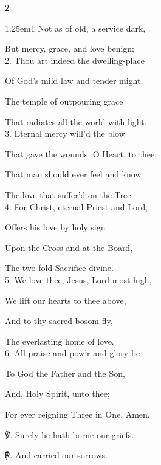 \begin{paracol}{2}
\begin{hangparas}{1.25em}{1}
Not as of old, a service dark,

But mercy, grace, and love benign;\\

2. Thou art indeed the dwelling-place

Of God's mild law and tender might,

The temple of outpouring grace

That radiates all the world with light.\\

3. Eternal mercy will'd the blow

That gave the wounds, O Heart, to thee;

That man should ever feel and know

The love that suffer'd on the Tree.\\

4. For Christ, eternal Priest and Lord,

Offers his love by holy sign

Upon the Cross and at the Board,

The two-fold Sacrifice divine.\\

5. We love thee, Jesus, Lord most high,

We lift our hearts to thee above,

And to thy sacred bosom fly,

The everlasting home of love.\\

6. All praise and pow'r and glory be

To God the Father and the Son,

And, Holy Spirit, unto thee;

For ever reigning Three in One. Amen.\\
\end{hangparas}

℣. Surely he hath borne our griefs.

℟. And carried our sorrows.


\fussy
\end{paracol}

\vspace{-0.25\baselineskip}


